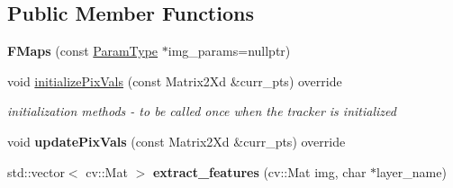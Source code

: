 \subsection*{Public Member Functions}
\begin{DoxyCompactItemize}
\item 
\hypertarget{classFMaps_a90624adb93b1f985f1cb35b4b740cb8b}{{\bfseries F\-Maps} (const \hyperlink{structFMapsParams}{Param\-Type} $\ast$img\-\_\-params=nullptr)}\label{classFMaps_a90624adb93b1f985f1cb35b4b740cb8b}

\item 
\hypertarget{classFMaps_a48978383570fedc6c4a9231038c80207}{void \hyperlink{classFMaps_a48978383570fedc6c4a9231038c80207}{initialize\-Pix\-Vals} (const Matrix2\-Xd \&curr\-\_\-pts) override}\label{classFMaps_a48978383570fedc6c4a9231038c80207}

\begin{DoxyCompactList}\small\item\em initialization methods -\/ to be called once when the tracker is initialized \end{DoxyCompactList}\item 
\hypertarget{classFMaps_a3cf0e3ced00ada359e8e13702fbde5ed}{void {\bfseries update\-Pix\-Vals} (const Matrix2\-Xd \&curr\-\_\-pts) override}\label{classFMaps_a3cf0e3ced00ada359e8e13702fbde5ed}

\item 
\hypertarget{classFMaps_afc82e1a0e9812c81a418d3663953df77}{std\-::vector$<$ cv\-::\-Mat $>$ {\bfseries extract\-\_\-features} (cv\-::\-Mat img, char $\ast$layer\-\_\-name)}\label{classFMaps_afc82e1a0e9812c81a418d3663953df77}

\end{DoxyCompactItemize}
